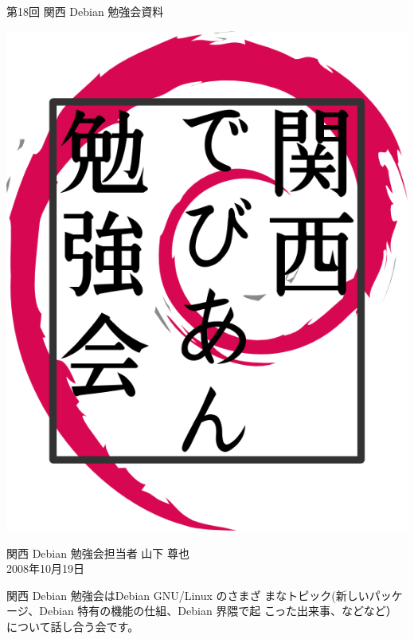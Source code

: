 \documentclass[mingoth,a4paper]{jsarticle}
\newcommand{\debmtgyear}{2008}
\newcommand{\debmtgdate}{19}
\newcommand{\debmtgmonth}{10}
\newcommand{\debmtgnumber}{18}
\begin{document}
\begin{titlepage}


 第\debmtgnumber{}回 関西 Debian 勉強会資料

\vspace{2cm}

\begin{center}
\includegraphics{image200802/kansaidebianlogo.png}
\end{center}

\begin{flushright}
\hfill{}関西 Debian 勉強会担当者 山下 尊也\\
\hfill{}\debmtgyear{}年\debmtgmonth{}月\debmtgdate{}日
\end{flushright}

\thispagestyle{empty}
\end{titlepage}

 
 関西 Debian 勉強会はDebian GNU/Linux のさまざ
 まなトピック(新しいパッケージ、Debian 特有の機能の仕組、Debian 界隈で起
 こった出来事、などなど）について話し合う会です。
\end{document}
